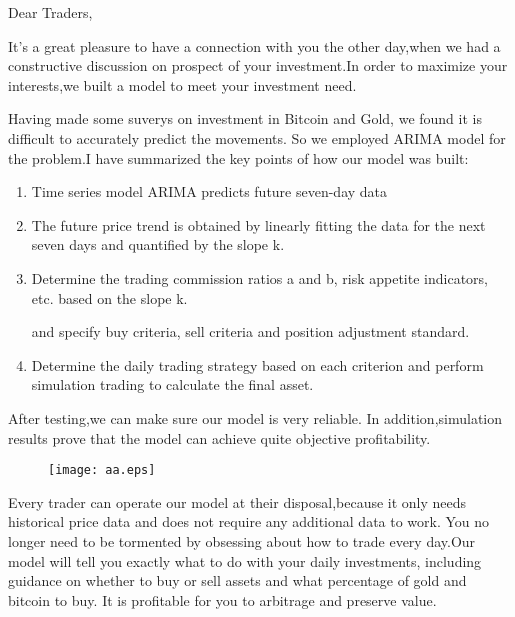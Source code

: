 \documentclass[letterpaper,11pt]{texMemo} %
\begin{document}
\maketitle 
Dear Traders,

   It's a great pleasure to have a connection with you the other day,when we had a constructive discussion on prospect of 
your investment.In order to maximize your interests,we built a model to meet your investment need.
   
   Having made some suverys on investment in Bitcoin and Gold,
we found it is difficult to accurately predict the movements.
So we employed ARIMA model for the problem.I have summarized the key points of how our model was built:

\begin{enumerate}    %
    \item Time series model ARIMA predicts future seven-day data
    
    \item The future price trend is obtained by linearly fitting the data for the next seven days and quantified by the slope k.
    
    \item Determine the trading commission ratios a and b, risk appetite indicators, etc. based on the slope k. 
    
    and specify buy criteria, sell criteria and position adjustment standard.

    \item Determine the daily trading strategy based on each criterion and perform simulation trading to calculate the final asset.

\end{enumerate}

   After testing,we can make sure our model is very reliable. In addition,simulation results prove that the model can achieve quite objective profitability.
   \begin{figure}[!h]
    \centering  %
    \texttt{[image: aa.eps]}
   \end{figure}

Every trader can operate our model at their disposal,because it only needs historical price data and does not require any additional data to work.
You no longer need to be tormented by obsessing about how to trade every day.Our model will tell you exactly what to do with your daily investments,
including guidance on whether to buy or sell assets and what percentage of gold and bitcoin to buy.
It is profitable for you to arbitrage and preserve value.
\end{document}
